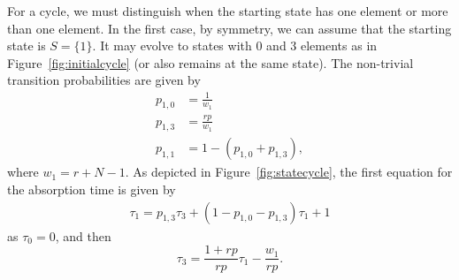 \documentclass[a4paper,english,10pt]{amsart}
\theoremstyle{definition}
\numberwithin{equation}{section}
\begin{document}
For a cycle, we must distinguish when the starting state has one element or more than one element. In the first case, by symmetry, we can assume that the starting state is $S=\{1\}$. It may evolve to states 
with 0 and 3 elements as in Figure~\ref{fig:initialcycle} (or also remains at the same state).
The non-trivial transition probabilities 
are given by 
\begin{align*}
  p_{1,0} &= \frac{1}{w_1} \\
  p_{1,3} &= \frac{rp}{w_1} \\
  p_{1,1} &= 1 - (p_{1,0} + p_{1,3}), 
\end{align*} 
where $w_1 = r + N -1$. As depicted in Figure~\ref{fig:statecycle}, the first equation for the absorption time is given by 
\begin{align} \label{eq:AT1cycle}
\tau_1  
=  p_{1,3} \tau_3+ (1 -  p_{1,0} - p_{1,3}) \tau_1 + 1 
\end{align}
as $\tau_{0}=0$, and then 
\begin{equation} \label{eq:AT3cycle}
\tau_3 = \frac{1+rp}{rp} \tau_1 - \frac{w_1}{rp}.
\end{equation}
%
\end{document}
